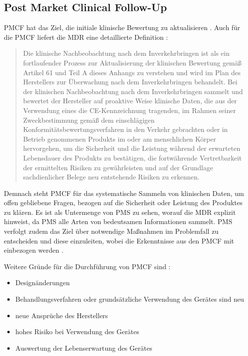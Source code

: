 \documentclass[a4paper,12pt]{report}
\begin{document}
\subsection{Post Market Clinical Follow-Up}\label{subsec:PMCF}
\ac{PMCF} hat das Ziel, die initiale klinische Bewertung zu aktualisieren \citep[vgl.][S. 286]{Abuhav2012}. Auch für die \ac{PMCF} liefert die \ac{MDR} eine detaillierte Definition \citep[Anhang XIV Teil A 5.]{MDR2017}:
\begin{quote}
Die klinische Nachbeobachtung nach dem Inverkehrbringen ist als ein fortlaufender Prozess zur Aktualisierung der klinischen Bewertung gemäß Artikel 61 und Teil A dieses Anhangs zu verstehen und wird im Plan des Herstellers zur Überwachung nach dem Inverkehrbringen behandelt. Bei der klinischen Nachbeobachtung nach dem Inverkehrbringen sammelt und bewertet der Hersteller auf proaktive Weise klinische Daten, die aus der Verwendung eines die CE-Kennzeichnung tragenden, im Rahmen seiner Zweckbestimmung gemäß dem einschlägigen Konformitätsbewertungsverfahren in den Verkehr gebrachten oder in Betrieb genommenen Produkts im oder am menschlichen Körper hervorgehen, um die Sicherheit und die Leistung während der erwarteten Lebensdauer des Produkts zu bestätigen, die fortwährende Vertretbarkeit der ermittelten Risiken zu gewährleisten und auf der Grundlage sachdienlicher Belege neu entstehende Risiken zu erkennen.
\end{quote}

Demnach steht PMCF für das systematische Sammeln von klinischen Daten, um offen gebliebene Fragen, bezogen auf die Sicherheit oder Leistung des Produktes zu klären. Es ist als Untermenge von PMS zu sehen, worauf die MDR explizit hinweist, da PMS alle Arten von bedeutsamen Informationen sammelt. PMS verfolgt zudem das Ziel über notwendige Maßnahmen im Problemfall zu entscheiden und diese einzuleiten, wobei die Erkenntnisse aus den PMCF mit einbezogen werden \citep[vgl.][]{Johner2017}.

Weitere Gründe für die Durchführung von PMCF sind \citep[vgl.][S. 287]{Abuhav2012}:
\begin{itemize}
\item Designänderungen
\item Behandlungsverfahren oder grundsätzliche Verwendung des Gerätes sind neu
\item neue Ansprüche des Herstellers
\item hohes Risiko bei Verwendung des Gerätes
\item Auswertung der Lebenserwartung des Gerätes
\end{itemize}
\end{document}
